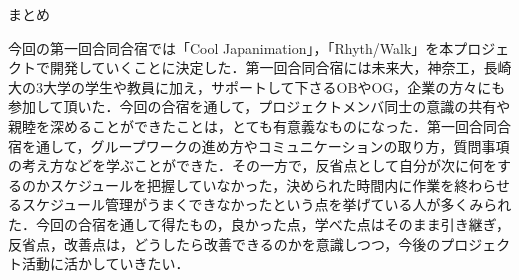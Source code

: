 \par
まとめ
\par
今回の第一回合同合宿では「Cool Japanimation」，「Rhyth/Walk」を本プロジェクトで開発していくことに決定した．第一回合同合宿には未来大，神奈工，長崎大の3大学の学生や教員に加え，サポートして下さるOBやOG，企業の方々にも参加して頂いた．今回の合宿を通して，プロジェクトメンバ同士の意識の共有や親睦を深めることができたことは，とても有意義なものになった．第一回合同合宿を通して，グループワークの進め方やコミュニケーションの取り方，質問事項の考え方などを学ぶことができた．その一方で，反省点として自分が次に何をするのかスケジュールを把握していなかった，決められた時間内に作業を終わらせるスケジュール管理がうまくできなかったという点を挙げている人が多くみられた．今回の合宿を通して得たもの，良かった点，学べた点はそのまま引き継ぎ，反省点，改善点は，どうしたら改善できるのかを意識しつつ，今後のプロジェクト活動に活かしていきたい．
